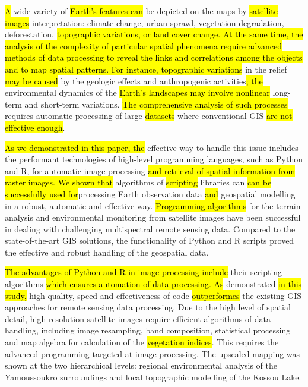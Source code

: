 \documentclass[jimaging,article,submit,pdftex,moreauthors]{Definitions/mdpi}
\begin{document}
\hl{A }wide variety of \hl{Earth's features can} be depicted on the maps by \hl{satellite images} interpretation: climate change, urban sprawl, vegetation degradation, deforestation, \hl{topographic variations, or land cover change. At the same time, the analysis of the complexity of particular spatial phenomena require advanced methods of data processing to reveal the links and correlations among the objects and to map spatial patterns. For instance, topographic variations }in the relief \hl{may be caused} by the geologic effects and anthropogenic activities\hl{; the }environmental dynamics of the \hl{Earth's landscapes may involve nonlinear} long-term and short-term variations. \hl{The comprehensive analysis of such processes} requires\hl{ }automatic processing of\hl{ }large \hl{datasets} where conventional GIS \hl{are not effective enough}. 

\hl{As we demonstrated in this paper, the} effective way to handle this issue includes the performant technologies of\hl{ }high-level programming languages, such as Python and R, for automatic image processing \hl{and retrieval of spatial information from raster images. We shown that} algorithms of \hl{scripting} libraries can \hl{can be successfully used for}processing \hl{ }Earth observation data\hl{ and }geospatial\hl{ }modelling in a robust, automatic and effective way. \hl{Programming algorithms} for the terrain analysis and environmental monitoring from satellite images have been successful in dealing with challenging multispectral remote sensing data. Compared to the state-of-the-art GIS solutions, the functionality of Python and R scripts proved the effective and robust handling of the geospatial data. 

\hl{The advantages of Python and R in image processing include} their scripting algorithms \hl{which ensures automation of data processing. As} demonstrated \hl{in this study,} high quality, speed and effectiveness of code \hl{outperformes} the existing GIS approaches for remote sensing data processing. Due to the high level of spatial detail, high-resolution satellite images require efficient algorithms of data handling, including image resampling, band composition, statistical processing and map algebra for\hl{ }calculation of the \hl{vegetation indices}. This requires the advanced programming targeted at image processing. The upscaled mapping was shown at the two hierarchical levels: regional environmental analysis of the Yamoussoukro surroundings and local topographic modelling of the Kossou Lake.
\end{document}
